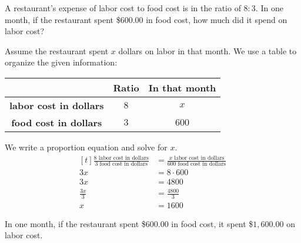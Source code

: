 \begin{myexample}
A restaurant's expense of labor cost to food cost is in the ratio of $8:3$. In one month, if the restaurant spent \$$600.00$ in food cost, how much did it spend on labor cost?
\end{myexample}
\begin{solution}
Assume the restaurant spent $x$ dollars on labor in that month. We use a table to organize the given information:

\begin{center}
\begin{tabular}{ | c | c | c | }
	\hline
    	& \textbf{Ratio} & \textbf{In that month} \\ \hline
  \textbf{labor cost in dollars} & $8$ & $x$ \\ \hline
  \textbf{food cost in dollars} & $3$ & $600$ \\ \hline
\end{tabular}
\end{center}

We write a proportion equation and solve for $x$.
\[
\begin{aligned}[t]
	\frac{8 \text{ labor cost in dollars}}{3 \text{ food cost in dollars}} &= \frac{x \text{ labor cost in dollars}}{600 \text{ food cost in dollars}} \\
	3x &= 8\cdot 600 \\
	3x &= 4800 \\
	\frac{3x}{3} &= \frac{4800}{3} \\
	x &= 1600
\end{aligned}
\]

In one month, if the restaurant spent \$$600.00$ in food cost, it spent \$$1,600.00$ on labor cost.
\end{solution}

